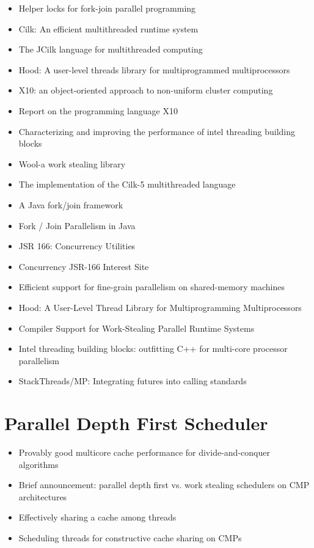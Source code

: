 \begin{itemize}
\item Helper locks for fork-join parallel programming
  \cite{Agrawal2010}
\item Cilk: An efficient multithreaded runtime system
  \cite{Blumofe1995}
\item The JCilk language for multithreaded computing
  \cite{Danaher2005}
\item Hood: A user-level threads library for multiprogrammed
  multiprocessors \cite{Blumofe1998}
\item X10: an object-oriented approach to non-uniform cluster
  computing \cite{Charles2005}
\item Report on the programming language X10 \cite{Saraswat2010}
\item Characterizing and improving the performance of intel threading
  building blocks \cite{Contreras2008}
\item[\texttimes] Wool-a work stealing library \cite{Faxen2009}
\item The implementation of the Cilk-5 multithreaded language
  \cite{Frigo1998}
\item A Java fork/join framework \cite{Lea2000}
\item Fork / Join Parallelism in Java \cite{Lea2000a}
\item JSR 166: Concurrency Utilities \cite{Lea2004}
\item Concurrency JSR-166 Interest Site \cite{Lea2006}
\item Efficient support for fine-grain parallelism on shared-memory
  machines \cite{Lowenthal1998}
\item Hood: A User-Level Thread Library for Multiprogramming
  Multiprocessors \cite{Papadopoulos1998}
\item Compiler Support for Work-Stealing Parallel Runtime Systems
  \cite{Raman2009}
\item Intel threading building blocks: outfitting C++ for multi-core
  processor parallelism \cite{Reinders2007}
\item StackThreads/MP: Integrating futures into calling standards
  \cite{Taura1999}
\end{itemize}


\section*{Parallel Depth First Scheduler}
\label{sec:lr-parallel-depth-first-scheduler}

\begin{itemize}
\item Provably good multicore cache performance for divide-and-conquer
  algorithms \cite{Blelloch2008}
\item Brief announcement: parallel depth first vs. work stealing
  schedulers on CMP architectures \cite{Liaskovitis2006}
\item Effectively sharing a cache among threads \cite{Blelloch2004}
\item Scheduling threads for constructive cache sharing on CMPs
  \cite{Chen2007}
\end{itemize}


